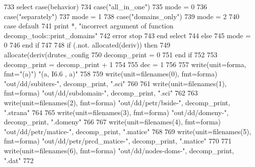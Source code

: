 \begin{DoxyCode}
733         \textcolor{keywordflow}{select case}(behavior)
734           \textcolor{keywordflow}{case}(\textcolor{stringliteral}{"all\_in\_one"})
735                 mode = 0
736           \textcolor{keywordflow}{case}(\textcolor{stringliteral}{"separately"})
737                 mode = 1
738           \textcolor{keywordflow}{case}(\textcolor{stringliteral}{"domains\_only"})
739                 mode = 2
740 \textcolor{keywordflow}{          case default}
741                 print *, \textcolor{stringliteral}{"incorrect argument of function decomp\_tools::print\_domains"}
742                 error stop
743 \textcolor{keywordflow}{        end select}
744       \textcolor{keywordflow}{else}
745         mode = 0
746 \textcolor{keywordflow}{      end if}
747       
748       \textcolor{keywordflow}{if} (.not. \textcolor{keyword}{allocated}(deriv)) \textcolor{keywordflow}{then}
749         \textcolor{keyword}{allocate}(deriv(drutes_config%
750         decomp\_print = 0
751 \textcolor{keywordflow}{      end if}
752 
753       decomp\_print = decomp\_print + 1
754 
755       dec = 1
756 
757       \textcolor{keyword}{write}(unit=forma, fmt=\textcolor{stringliteral}{"(a)"}) \textcolor{stringliteral}{"(a,  I6.6 , a)"}
758 
759       \textcolor{keyword}{write}(unit=filenames(0), fmt=forma) \textcolor{stringliteral}{"out/dd/subiters-"},  decomp\_print\textcolor{comment}{, }\textcolor{stringliteral}{".sci"}
760 
761       \textcolor{keyword}{write}(unit=filenames(1), fmt=forma) \textcolor{stringliteral}{"out/dd/subdomain-"},  decomp\_print\textcolor{comment}{, }\textcolor{stringliteral}{".sci"}
762       
763       \textcolor{keyword}{write}(unit=filenames(2), fmt=forma) \textcolor{stringliteral}{"out/dd/petr/bside-"}, decomp\_print\textcolor{comment}{, }\textcolor{stringliteral}{".strana"}
764 
765       \textcolor{keyword}{write}(unit=filenames(3), fmt=forma) \textcolor{stringliteral}{"out/dd/domeny-"}, decomp\_print\textcolor{comment}{, }\textcolor{stringliteral}{".domeny"}
766 
767       \textcolor{keyword}{write}(unit=filenames(4), fmt=forma) \textcolor{stringliteral}{"out/dd/petr/matice-"}, decomp\_print\textcolor{comment}{, }\textcolor{stringliteral}{".matice"}
768 
769       \textcolor{keyword}{write}(unit=filenames(5), fmt=forma) \textcolor{stringliteral}{"out/dd/petr/prcd\_matice-"}, decomp\_print\textcolor{comment}{, }\textcolor{stringliteral}{".matice"}
770       
771       \textcolor{keyword}{write}(unit=filenames(6), fmt=forma) \textcolor{stringliteral}{"out/dd/nodes-doms-"}, decomp\_print\textcolor{comment}{, }\textcolor{stringliteral}{".dat"}
772       

\end{DoxyCode}
